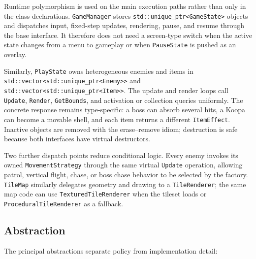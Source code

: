 \documentclass{template}
\begin{document}
Runtime polymorphism is used on the main execution paths rather than only in
the class declarations. \texttt{GameManager} stores
\texttt{std::unique\_ptr<GameState>} objects and dispatches input, fixed-step
updates, rendering, pause, and resume through the base interface. It therefore
does not need a screen-type switch when the active state changes from a menu to
gameplay or when \texttt{PauseState} is pushed as an overlay.

Similarly, \texttt{PlayState} owns heterogeneous enemies and items in
\texttt{std::vector<std::unique\_ptr<Enemy>>} and
\texttt{std::vector<std::unique\_ptr<Item>>}. The update and render loops call
\texttt{Update}, \texttt{Render}, \texttt{GetBounds}, and activation or
collection queries uniformly. The concrete response remains type-specific: a
boss can absorb several hits, a Koopa can become a movable shell, and each item
returns a different \texttt{ItemEffect}. Inactive objects are removed with the
erase--remove idiom; destruction is safe because both interfaces have virtual
destructors.

Two further dispatch points reduce conditional logic. Every enemy invokes its
owned \texttt{MovementStrategy} through the same virtual \texttt{Update}
operation, allowing patrol, vertical flight, chase, or boss chase behavior to
be selected by the factory. \texttt{TileMap} similarly delegates geometry and
drawing to a \texttt{TileRenderer}; the same map code can use
\texttt{TexturedTileRenderer} when the tileset loads or
\texttt{ProceduralTileRenderer} as a fallback.

\subsection{Abstraction}

The principal abstractions separate policy from implementation detail:
\end{document}
